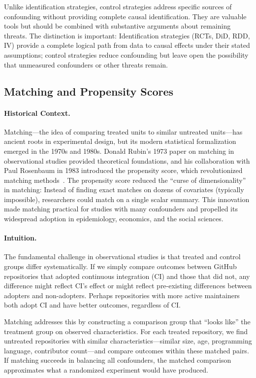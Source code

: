 Unlike identification strategies, control strategies address specific sources of confounding without providing complete causal identification.
They are valuable tools but should be combined with substantive arguments about remaining threats.
The distinction is important: Identification strategies (RCTs, DiD, RDD, IV) provide a complete logical path from data to causal effects under their stated assumptions; control strategies reduce confounding but leave open the possibility that unmeasured confounders or other threats remain.

\subsection{Matching and Propensity Scores}

\paragraph{Historical Context.}
Matching---the idea of comparing treated units to similar untreated units---has ancient roots in experimental design, but its modern statistical formalization emerged in the 1970s and 1980s.
Donald Rubin's 1973 paper on matching in observational studies provided theoretical foundations, and his collaboration with Paul Rosenbaum in 1983 introduced the propensity score, which revolutionized matching methods~\cite{rosenbaum1983central}.
The propensity score reduced the ``curse of dimensionality'' in matching: Instead of finding exact matches on dozens of covariates (typically impossible), researchers could match on a single scalar summary.
This innovation made matching practical for studies with many confounders and propelled its widespread adoption in epidemiology, economics, and the social sciences.

\paragraph{Intuition.}
The fundamental challenge in observational studies is that treated and control groups differ systematically.
If we simply compare outcomes between GitHub repositories that adopted continuous integration (CI) and those that did not, any difference might reflect CI's effect or might reflect pre-existing differences between adopters and non-adopters.
Perhaps repositories with more active maintainers both adopt CI and have better outcomes, regardless of CI.

Matching addresses this by constructing a comparison group that ``looks like'' the treatment group on observed characteristics.
For each treated repository, we find untreated repositories with similar characteristics---similar size, age, programming language, contributor count---and compare outcomes within these matched pairs.
If matching succeeds in balancing all confounders, the matched comparison approximates what a randomized experiment would have produced.

